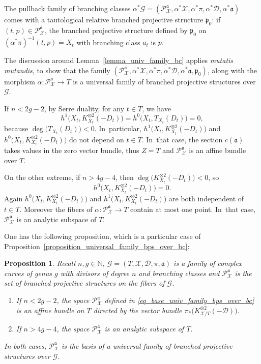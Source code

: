 \documentclass[10pt]{amsart}
\newcommand{\N}{\mathbb N}
\theoremstyle{definition}
\theoremstyle{plain}
\newtheorem{proposition}[definition]{Proposition}
\begin{document}
The pullback family of branching classes $\alpha^*\mathcal G = \left(\mathcal P_{\mathcal X}^{\mathfrak a}, \alpha^*\mathcal X, \alpha^* \pi, \alpha^* \mathcal D, \alpha^* \mathfrak a\right)$ comes with a tautological relative branched projective structure $\mathfrak p_0$: if $(t, p) \in \mathcal P_{\mathcal X}^{\mathfrak a}$, the branched projective structure defined by $\mathfrak p_0$ on $\left(\alpha^*\pi\right)^{-1}(t, p) = X_t$ with branching class $a_t$ is $p$.

The discussion around Lemma~\ref{lemma_univ_family_bc} applies \emph{mutatis mutandis}, to show that the family $\left(\mathcal P_{\mathcal X}^{\mathfrak a}, \alpha^*\mathcal X, \alpha^* \pi, \alpha^* \mathcal D, \alpha^* \mathfrak a, \mathfrak p_0\right)$, along with the morphism $\alpha: \mathcal P_{\mathcal X}^{\mathfrak a} \to T$ is a universal family of branched projective structures over $\mathcal G$.

If $n < 2g-2$, by Serre duality, for any $t \in T$, we have
\[
h^1\bigl(X_t, K_{X_t}^{\otimes 2}(-D_t)\bigr) = h^0\bigl(X_t, T_{X_t}(D_t)\bigr) = 0,
\]
because $\deg\bigl(T_{X_t}(D_t)\bigr) < 0$. In~particular, $h^1\bigl(X_t, K_{X_t}^{\otimes 2}(-D_t)\bigr)$ and $h^0\bigl(X_t, K_{X_t}^{\otimes 2}(-D_t)\bigr)$ do not depend on $t \in T$. In~that case, the section $c(\mathfrak a)$ takes values in the zero vector bundle, thus $Z = T$ and $\mathcal P_{\mathcal X}^{\mathfrak a}$ is an affine bundle over $T$.

On the other extreme, if $n > 4g-4$, then $\deg\bigl(K_{X_t}^{\otimes 2}(-D_t)\bigr) < 0$, so
\[
h^0\bigl(X_t, K_{X_t}^{\otimes 2}(-D_t)\bigr) = 0.
\]
Again $h^0\bigl(X_t, K_{X_t}^{\otimes 2}(-D_t)\bigr)$ and $h^1\bigl(X_t, K_{X_t}^{\otimes 2}(-D_t)\bigr)$ are both independent of $t \in T$.
Moreover the fibers of $\alpha: \mathcal P_{\mathcal X}^{\mathfrak a} \to T$ contain at most one point. In~that case, $\mathcal P_{\mathcal X}^{\mathfrak a}$ is an analytic subspace of $T$.

One has the following proposition, which is a particular case of Proposition~\ref{proposition_universal_family_bps_over_bc}:

\begin{proposition}\label{proposition_univ_family_bps_low_high_deg}
Recall $n, g \in \N$, $\mathcal G = (T, \mathcal X, \mathcal D, \pi, \mathfrak a)$ is a family of complex curves of genus $g$ with divisors of degree $n$ and branching classes and $\mathcal P_{\mathcal X}^{\mathfrak a}$ is the set of branched projective structures on the fibers of $\mathcal G$.
\begin{enumerate}
\item
If $n < 2g-2$, the space $\mathcal P_{\mathcal X}^{\mathfrak a}$ defined in \eqref{eq_base_univ_family_bps_over_bc} is an affine bundle on $T$ directed by the vector bundle $\pi_*\bigl(K_{\mathcal X/T}^{\otimes 2}(-\mathcal D)\bigr)$.
\item
If $n > 4g-4$, the space $\mathcal P_{\mathcal X}^{\mathfrak a}$ is an analytic subspace of $T$.
\end{enumerate}
In both cases, $\mathcal P_{\mathcal X}^{\mathfrak a}$ is the basis of a universal family of branched projective structures over $\mathcal G$.
\end{proposition}
\end{document}
